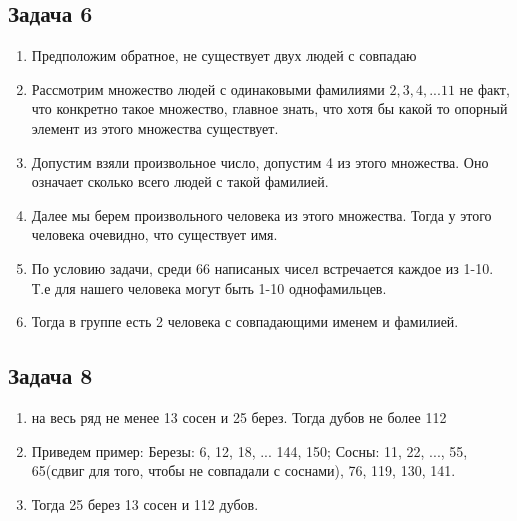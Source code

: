 \documentclass[a4paper,12pt]{article}
\begin{document}
\subsection{Задача 6}
\begin{enumerate}
    \item Предположим обратное, не существует двух людей с совпадаю
    \item Рассмотрим множество людей с одинаковыми фамилиями ${2, 3, 4,...11}$ не факт, что конкретно такое множество, главное знать, что хотя бы какой то опорный элемент из этого множества существует.
    \item Допустим взяли произвольное число, допустим 4 из этого множества. Оно означает сколько всего людей с такой фамилией.
    \item Далее мы берем произвольного человека из этого множества. Тогда у этого человека очевидно, что существует имя. 
    \item По условию задачи, среди 66 написаных чисел встречается каждое из 1-10. Т.е для нашего человека могут быть 1-10 однофамильцев.
    \item Тогда в группе есть 2 человека с совпадающими именем и фамилией.
\end{enumerate}

\subsection{Задача 8}
\begin{enumerate}
    \item на весь ряд не менее 13 сосен и 25 берез. Тогда дубов не более 112
    \item Приведем пример: Березы: 6, 12, 18, ... 144, 150; Сосны: 11, 22, ..., 55, 65(сдвиг для того, чтобы не совпадали с соснами), 76, 119, 130, 141.
    \item Тогда 25 берез 13 сосен и 112 дубов.
\end{enumerate}
\end{document}
